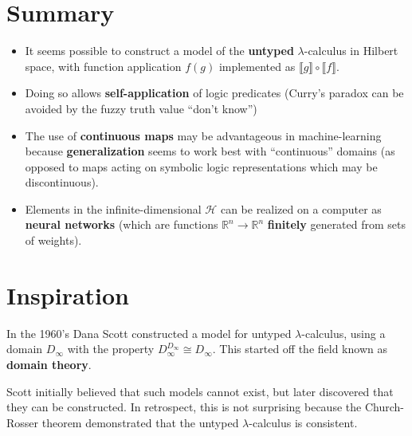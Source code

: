 \maketitle

\section*{Summary}
\begin{itemize}
	\item It seems possible to construct a model of the \textbf{untyped} $\lambda$-calculus in Hilbert space, with function application $f(g)$ implemented as $\llbracket g \rrbracket \circ \llbracket f \rrbracket$.
	
	\item Doing so allows \textbf{self-application} of logic predicates (Curry's paradox can be avoided by the fuzzy truth value ``don't know'')
	
	\item The use of \textbf{continuous maps} may be advantageous in machine-learning because \textbf{generalization} seems to work best with ``continuous'' domains (as opposed to maps acting on symbolic logic representations which may be discontinuous).

	\item Elements in the infinite-dimensional $\mathcal{H}$ can be realized on a computer as \textbf{neural networks} (which are functions $\mathbb{R}^n \rightarrow \mathbb{R}^n$ \textbf{finitely} generated from sets of weights).
\end{itemize}


\setcounter{section}{-1}
\section{Inspiration}

In the 1960's Dana Scott constructed a model for untyped $\lambda$-calculus, using a domain $D_{\infty}$ with the property $D_{\infty}^{D_{\infty}} \cong D_{\infty}$.  This started off the field known as \textbf{domain theory}.

Scott initially believed that such models cannot exist, but later discovered that they can be constructed.  In retrospect, this is not surprising because the Church-Rosser theorem demonstrated that the untyped $\lambda$-calculus is consistent.

